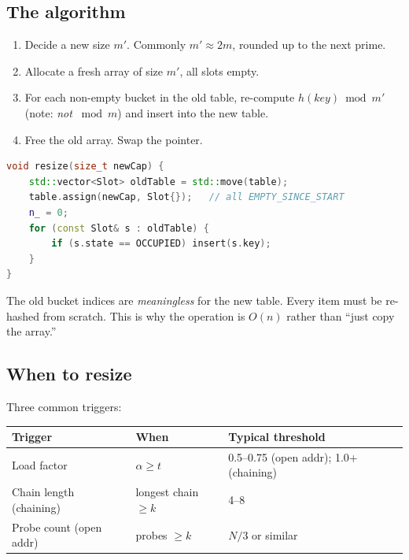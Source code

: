 \documentclass[11pt]{article}
\begin{document}
\subsection*{The algorithm}

\begin{enumerate}[leftmargin=*]
    \item Decide a new size $m'$. Commonly $m' \approx 2m$, rounded
          up to the next prime.
    \item Allocate a fresh array of size $m'$, all slots empty.
    \item For each non-empty bucket in the old table, re-compute
          $h(key) \bmod m'$ (note: \emph{not} $\bmod m$) and
          insert into the new table.
    \item Free the old array. Swap the pointer.
\end{enumerate}

\begin{examplebox}[Resize]
\begin{lstlisting}[language=C++,basicstyle=\ttfamily\small,frame=single]
void resize(size_t newCap) {
    std::vector<Slot> oldTable = std::move(table);
    table.assign(newCap, Slot{});   // all EMPTY_SINCE_START
    n_ = 0;
    for (const Slot& s : oldTable) {
        if (s.state == OCCUPIED) insert(s.key);
    }
}
\end{lstlisting}
\end{examplebox}

The old bucket indices are \emph{meaningless} for the new table.
Every item must be re-hashed from scratch. This is why the
operation is $O(n)$ rather than ``just copy the array.''

\subsection*{When to resize}

Three common triggers:

\begin{center}
\begin{tabular}{|l|l|l|}
\hline
\textbf{Trigger} & \textbf{When} & \textbf{Typical threshold} \\
\hline
Load factor & $\alpha \geq t$             & 0.5--0.75 (open addr); 1.0+ (chaining) \\
Chain length (chaining) & longest chain $\geq k$ & 4--8 \\
Probe count (open addr) & probes $\geq k$   & $N/3$ or similar \\
\hline
\end{tabular}
\end{center}
\end{document}
